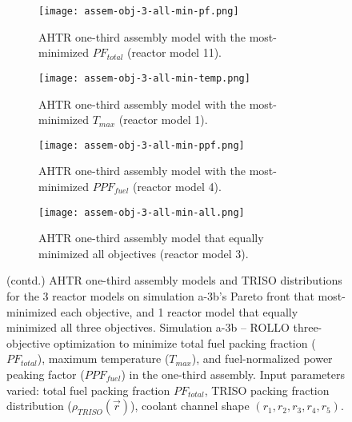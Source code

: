 \begin{figure}[htbp!]
    \ContinuedFloat
    \begin{subfigure}{0.49\textwidth}
        \centering
        \texttt{[image: assem-obj-3-all-min-pf.png]}
        \caption{\gls{AHTR} one-third assembly model with the most-minimized $PF_{total}$ 
        (reactor model 11).}
        \label{fig:assem-obj-3-all-min-pf} 
    \end{subfigure}
    \begin{subfigure}{0.49\textwidth}
        \centering
        \texttt{[image: assem-obj-3-all-min-temp.png]}
        \caption{\gls{AHTR} one-third assembly model with the most-minimized $T_{max}$
        (reactor model 1).}
        \label{fig:assem-obj-3-all-min-temp} 
    \end{subfigure}
    \begin{subfigure}{0.49\textwidth}
        \centering
        \texttt{[image: assem-obj-3-all-min-ppf.png]}
        \caption{\gls{AHTR} one-third assembly model with the most-minimized $PPF_{fuel}$
        (reactor model 4).}
        \label{fig:assem-obj-3-all-min-ppf} 
    \end{subfigure}
    \begin{subfigure}{0.49\textwidth}
        \centering
        \texttt{[image: assem-obj-3-all-min-all.png]}
        \caption{\gls{AHTR} one-third assembly model that equally minimized all 
        objectives (reactor model 3).}
        \label{fig:assem-obj-3-all-min-all} 
    \end{subfigure}
    \begin{subfigure}{.3\textwidth}
    \vspace{1cm}
    \centering
\end{subfigure}
    \caption{(contd.) AHTR one-third assembly models and TRISO distributions for the 3 
    reactor models on simulation a-3b's Pareto front that most-minimized each 
    objective, and 1 reactor model that equally minimized all three objectives.
    Simulation a-3b -- ROLLO three-objective optimization to minimize 
    total fuel packing fraction ($PF_{total}$), maximum temperature ($T_{max}$), 
    and fuel-normalized power peaking factor ($PPF_{fuel}$) in the one-third assembly. 
    Input parameters varied: total fuel packing fraction $PF_{total}$, 
    TRISO packing fraction distribution ($\rho_{TRISO}(\vec{r})$), 
    coolant channel shape $(r_1, r_2, r_3, r_4, r_5)$.}
\end{figure}

